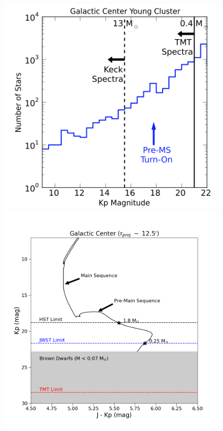 \documentclass[11pt]{article}
\begin{document}



\begin{figure}
    \centering
    \includegraphics[scale=0.47]{TMT_YNC.png}
    \includegraphics[scale=0.3]{TMT_comp.png}

\end{figure}
\end{document}
